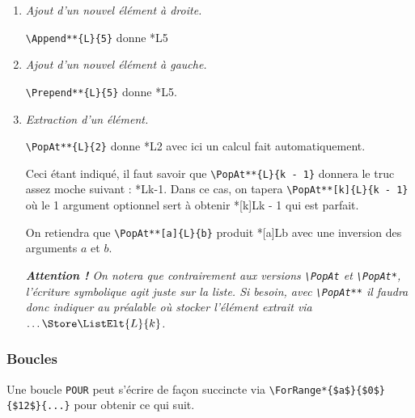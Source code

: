 \begin{enumerate}
	\item \textit{Ajout d'un nouvel élément à droite.}

	      \verb+\Append**{L}{5}+ donne \Append**{L}{5}


	\item \textit{Ajout d'un nouvel élément à gauche.}

	      \verb+\Prepend**{L}{5}+ donne \Prepend**{L}{5}.


	\item \textit{Extraction d'un élément.}

	      \verb+\PopAt**{L}{2}+ donne \PopAt**{L}{2} avec ici un calcul fait automatiquement.

	      Ceci étant indiqué, il faut savoir que \verb+\PopAt**{L}{k - 1}+ donnera le truc assez moche suivant : \PopAt**{L}{k-1}.
	      Dans ce cas, on tapera \verb+\PopAt**[k]{L}{k - 1}+ où le 1\ier{} argument optionnel sert à obtenir \PopAt**[k]{L}{k - 1} qui est parfait.

	      On retiendra que \verb+\PopAt**[a]{L}{b}+ produit \PopAt**[a]{L}{b} avec une inversion des arguments $a$ et $b$.

	      \smallskip

	      \emph{\textbf{Attention !} On notera que contrairement aux versions \emph{\texttt{\textbackslash{}PopAt}} et \emph{\texttt{\textbackslash{}PopAt*}}, l'écriture symbolique agit juste sur la liste. Si besoin, avec \emph{\texttt{\textbackslash{}PopAt**}} il faudra donc indiquer au préalable où stocker l'élément extrait via $\dots \Store \ListElt{L}{k}$.}
\end{enumerate}




\subsubsection{Boucles}

Une boucle \verb+POUR+ peut s'écrire de façon succincte via \verb+\ForRange*{$a$}{$0$}{$12$}{...}+ pour obtenir ce qui suit.

\begin{algo}[.55]
\end{algo}


\medskip


